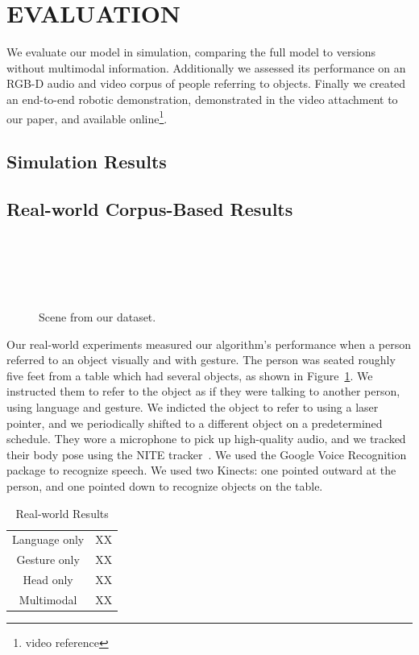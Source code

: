 \documentclass[letterpaper, 10 pt, conference]{ieeeconf}
\begin{document}
\section{EVALUATION}

We evaluate our model in simulation, comparing the full model to
versions without multimodal information.  Additionally we assessed its
performance on an RGB-D audio and video corpus of people referring to
objects.  Finally we created an end-to-end robotic demonstration,
demonstrated in the video attachment to our paper, and available
online\footnote{video reference}. 

\subsection{Simulation Results}

\subsection{Real-world Corpus-Based Results}

\begin{figure}
\parbox{1\linewidth}{~\\~\\~\\~\\}
\caption{Scene from our dataset.\label{fig:corpus_scene}}
\end{figure}

Our real-world experiments measured our algorithm's performance when a
person referred to an object visually and with gesture.  The person
was seated roughly five feet from a table which had several objects,
as shown in Figure~\ref{fig:corpus_scene}.  We instructed them to
refer to the object as if they were talking to another person, using
language and gesture.  We indicted the object to refer to using a
laser pointer, and we periodically shifted to a different object on a
predetermined schedule.  They wore a microphone to pick up
high-quality audio, and we tracked their body pose using the NITE
tracker~\citep{tracker}.  We used the Google Voice Recognition package
to recognize speech.  We used two Kinects: one pointed outward at the
person, and one pointed down to recognize objects on the table.

\begin{table}
\begin{tabular}{cc}
Language only &  XX\\
Gesture only  &  XX\\
Head only     &  XX\\
Multimodal    &  XX\\
\end{tabular}
\caption{Real-world Results}
\end{table}
\end{document}
